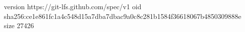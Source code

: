 version https://git-lfs.github.com/spec/v1
oid sha256:ce1e861fc1a4c548d15a7dba7dbac9a0c8c281b1584f36618067b4850309888e
size 27426

